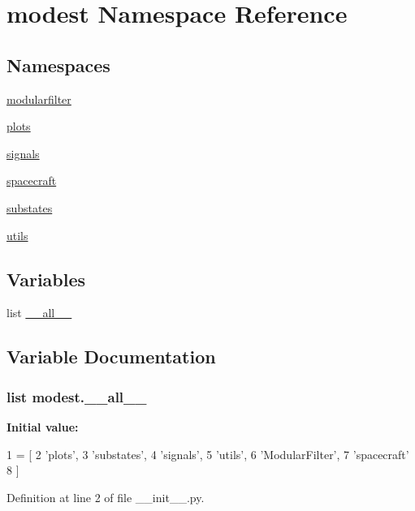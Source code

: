 \hypertarget{namespacemodest}{}\section{modest Namespace Reference}
\label{namespacemodest}
\subsection*{Namespaces}
\begin{DoxyCompactItemize}
\item 
 \hyperlink{namespacemodest_1_1modularfilter}{modularfilter}
\item 
 \hyperlink{namespacemodest_1_1plots}{plots}
\item 
 \hyperlink{namespacemodest_1_1signals}{signals}
\item 
 \hyperlink{namespacemodest_1_1spacecraft}{spacecraft}
\item 
 \hyperlink{namespacemodest_1_1substates}{substates}
\item 
 \hyperlink{namespacemodest_1_1utils}{utils}
\end{DoxyCompactItemize}
\subsection*{Variables}
\begin{DoxyCompactItemize}
\item 
list \hyperlink{namespacemodest_a8c36cd07da61d6f2919f708a59f575a7}{\+\_\+\+\_\+all\+\_\+\+\_\+}
\end{DoxyCompactItemize}


\subsection{Variable Documentation}
\subsubsection[{\texorpdfstring{\+\_\+\+\_\+all\+\_\+\+\_\+}{__all__}}]{\setlength{\rightskip}{0pt plus 5cm}list modest.\+\_\+\+\_\+all\+\_\+\+\_\+\hspace{0.3cm}{\ttfamily [private]}}\hypertarget{namespacemodest_a8c36cd07da61d6f2919f708a59f575a7}{}\label{namespacemodest_a8c36cd07da61d6f2919f708a59f575a7}
{\bfseries Initial value\+:}
\begin{DoxyCode}
1 = [
2     \textcolor{stringliteral}{'plots'},
3     \textcolor{stringliteral}{'substates'},
4     \textcolor{stringliteral}{'signals'},
5     \textcolor{stringliteral}{'utils'},
6     \textcolor{stringliteral}{'ModularFilter'},
7     \textcolor{stringliteral}{'spacecraft'}
8 ]
\end{DoxyCode}


Definition at line 2 of file \+\_\+\+\_\+init\+\_\+\+\_\+.\+py.


